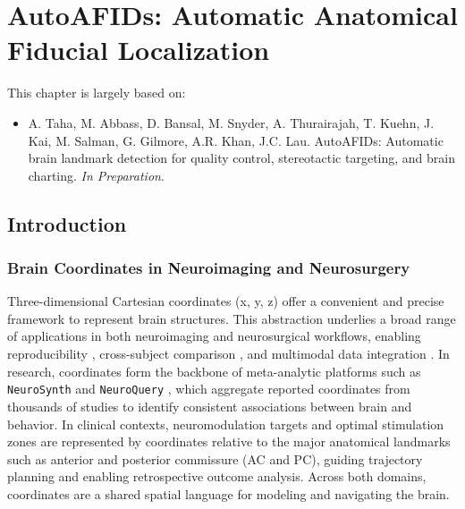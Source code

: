 \chapter{AutoAFIDs: Automatic Anatomical Fiducial Localization} \label{chap:AutoAFIDs}
\newpage
\sloppy
This chapter is largely based on:
\begin{itemize}[noitemsep,topsep=0pt]
    \item {\small A. Taha, M. Abbass, D. Bansal, M. Snyder, A. Thurairajah, T. Kuehn, J. Kai, M. Salman, G. Gilmore, A.R. Khan, J.C. Lau.} AutoAFIDs: Automatic brain landmark detection for quality control, stereotactic targeting, and brain charting. \textit{In Preparation}.
\end{itemize}


\section{Introduction}
\subsection{Brain Coordinates in Neuroimaging and Neurosurgery}
Three-dimensional Cartesian coordinates (x, y, z) offer a convenient and precise framework to represent brain structures. This abstraction underlies a broad range of applications in both neuroimaging and neurosurgical workflows, enabling reproducibility \cite{Dockes2020-nw}, cross-subject comparison \cite{Glasser2016-ko}, and multimodal data integration \cite{Uludag2014-qz}. In research, coordinates form the backbone of meta-analytic platforms such as \texttt{NeuroSynth} \cite{Yarkoni2011-sr} and \texttt{NeuroQuery} \cite{Dockes2020-nw}, which aggregate reported coordinates from thousands of studies to identify consistent associations between brain and behavior. In clinical contexts, neuromodulation targets and optimal stimulation zones are represented by coordinates relative to the major anatomical landmarks \cite{Horn2017-bi} such as anterior and posterior commissure (AC and PC), guiding trajectory planning and enabling retrospective outcome analysis. Across both domains, coordinates are a shared spatial language for modeling and navigating the brain.

